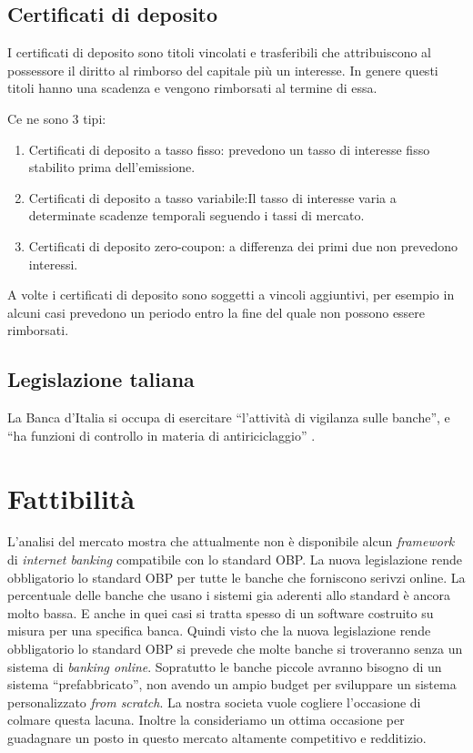 \documentclass[10pt]{softeng} %
\begin{document}

\subsection{Certificati di deposito}

I certificati di deposito sono titoli vincolati e trasferibili che attribuiscono al possessore il diritto al rimborso del capitale più un interesse.
In genere questi titoli hanno una scadenza e vengono rimborsati al termine di essa.

Ce ne sono 3 tipi:
\begin{enumerate}
    \item Certificati di deposito a tasso fisso: prevedono un tasso di interesse fisso stabilito prima dell'emissione.
    \item Certificati di deposito a tasso variabile:Il tasso di interesse varia a determinate scadenze temporali seguendo i tassi di mercato.
    \item Certificati di deposito zero-coupon: a differenza dei primi due non prevedono interessi.
\end{enumerate}

A volte i certificati di deposito sono soggetti a vincoli aggiuntivi, per esempio in alcuni casi prevedono un periodo entro la fine del quale non possono essere rimborsati.

\subsection{Legislazione taliana}

La Banca d'Italia si occupa di esercitare ``l'attivit\`a di vigilanza sulle banche'', e ``ha funzioni di controllo in materia di antiriciclaggio'' \cite[Funzioni]{banca_italia}.


\section{Fattibilit\`a}

L'analisi del mercato mostra che attualmente non \`e disponibile alcun \emph{framework} di \emph{internet banking} compatibile con lo standard OBP.
La nuova legislazione rende obbligatorio lo standard OBP per tutte le banche che forniscono serivzi online.
La percentuale delle banche che usano i sistemi gia aderenti allo standard \`e ancora molto bassa.
E anche in quei casi si tratta spesso di un software costruito su misura per una specifica banca.
Quindi visto che la nuova legislazione rende obbligatorio lo standard OBP si prevede che molte banche si troveranno senza un sistema di \emph{banking online}.
Sopratutto le banche piccole avranno bisogno di un sistema ``prefabbricato'', non avendo un ampio budget per sviluppare un sistema personalizzato \emph{from scratch}.
La nostra societa vuole cogliere l'occasione di colmare questa lacuna.
Inoltre la consideriamo un ottima occasione per guadagnare un posto in questo mercato altamente competitivo e redditizio.
\end{document}
